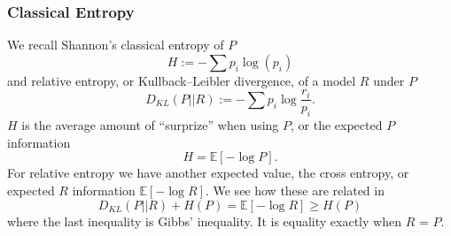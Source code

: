 \subsubsection{Classical Entropy}
We recall Shannon's classical entropy of $P$
\[
 H := -\sum p_i \log(p_i)
\]
and relative entropy, or Kullback–Leibler divergence, of a model $R$ under $P$
\[
D_{KL}(P||R) := -\sum p_i \log{\frac{r_i}{p_i}}.
\]
$H$ is the average amount of ``surprize'' when using $P$, or the expected $P$ information
\[
H = \mathbb{E}[-\log{P}].
\] 
For relative entropy we have another expected value, the cross entropy, or expected $R$ information $\mathbb{E}[-\log{R}]$.  We see how these are related in
\[
D_{KL}(P||R) + H(P) = \mathbb{E}[-\log{R}]  \ge H(P)
\]
where the last inequality is Gibbs' inequality.  It is equality exactly when $R$ = $P$.

